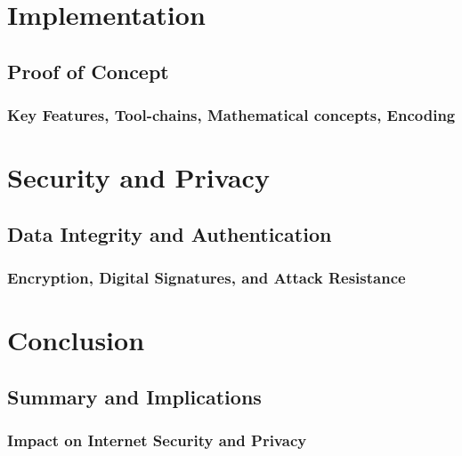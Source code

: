 \documentclass{article}
\begin{document}
\section{Implementation}
\subsection{Proof of Concept}
\subsubsection{Key Features, Tool-chains, Mathematical concepts, Encoding}

\section{Security and Privacy}
\subsection{Data Integrity and Authentication}
\subsubsection{Encryption, Digital Signatures, and Attack Resistance}

\section{Conclusion}
\subsection{Summary and Implications}
\subsubsection{Impact on Internet Security and Privacy}



\newpage
\makeworkscited
\end{document}
